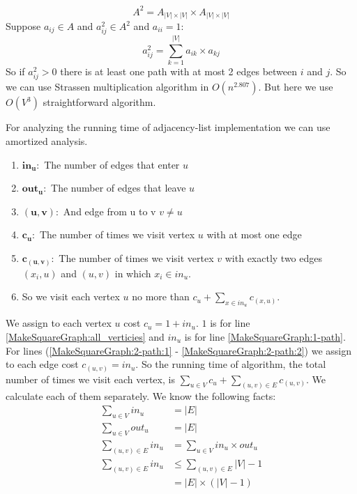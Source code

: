 \documentclass{book}
\begin{document}
	\begin{equation*}
	A^2 = A_{|V| \times |V|} \times A_{|V| \times |V|}
	\end{equation*}
	Suppose $a_{ij} \in A$ and $a^2_{ij} \in A^2$ and $a_{ii} = 1$:
	\begin{equation*}
	a^2_{ij} = \sum_{k = 1}^{|V|}{a_{ik} \times a_{kj}}
	\end{equation*}
	So if $a^2_{ij} > 0$ there is at least one path with at most 2 edges between $i$ and $j$. So we can use Strassen multiplication algorithm in $O(n^{2.807})$. But here we use $O(V^3)$ straightforward algorithm.
	 \par For analyzing the running time of adjacency-list implementation we can use amortized analysis.
	\begin{enumerate}
		\item $\boldsymbol{in_u:}$ The number of edges that enter $u$
		\item $\boldsymbol{out_u:}$ The number of edges that leave $u$
		\item $\boldsymbol{(u, v):}$ And edge from u to v $v \ne u$
		\item $\boldsymbol{c_u:}$ The number of times we visit vertex $u$ with at most one edge
		\item $\boldsymbol{c_{(u, v)}:}$ The number of times we visit vertex $v$ with exactly two edges $(x_i, u)$ and $(u, v)$ in which $x_i \in in_u$.
		\item So we visit each vertex $u$ no more than $c_u + \sum_{x \in in_u} {c_{(x, u)}}$.
	\end{enumerate}
	We assign to each vertex $u$ cost $c_u = 1 + in_u$. $1$ is for line \ref{MakeSquareGraph:all_verticies} and $in_u$ is for line \ref{MakeSquareGraph:1-path}. For lines (\ref{MakeSquareGraph:2-path:1} - \ref{MakeSquareGraph:2-path:2}) we assign to each edge cost $c_{(u, v)} = in_u$. So the running time of algorithm, the total number of times we visit each vertex, is $\sum_{u \in V} c_u + \sum_{(u, v) \in E}{c_{(u, v)}}$. We calculate each of them separately. We know the following facts:
	\begin{equation*}
	\begin{split}
		\sum_{u \in V}{in_u} &= |E| \\
		\sum_{u \in V}{out_u} &= |E| \\
		\sum_{(u, v) \in E}{in_u} &= \sum_{u \in V}{in_u \times out_u} \\
		\sum_{(u, v) \in E}{in_u} &\le \sum_{(u, v) \in E}{|V| - 1} \\
		&= |E| \times (|V| - 1)
	\end{split}	
	\end{equation*}
\end{document}
